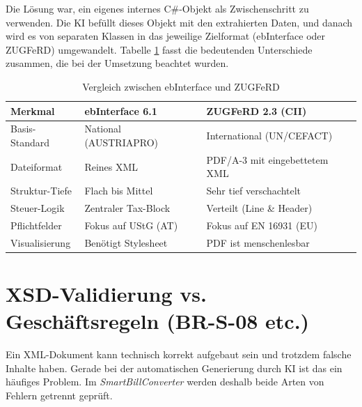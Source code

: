 Die Lösung war, ein eigenes internes C\#-Objekt als Zwischenschritt zu verwenden. Die KI befüllt dieses Objekt mit den extrahierten Daten, und danach wird es von separaten Klassen in das jeweilige Zielformat (ebInterface oder ZUGFeRD) umgewandelt.
Tabelle \ref{tab:format_comparison} fasst die bedeutenden Unterschiede zusammen, die bei der Umsetzung beachtet wurden.

\begin{table}[h]
    \centering
    \begin{tabular}{|p{4cm}|p{5cm}|p{5cm}|}
    \hline
    \textbf{Merkmal} & \textbf{ebInterface 6.1} & \textbf{ZUGFeRD 2.3 (CII)} \\
    \hline
    Basis-Standard & National (AUSTRIAPRO) & International (UN/CEFACT) \\
    \hline
    Dateiformat & Reines XML & PDF/A-3 mit eingebettetem XML \\
    \hline
    Struktur-Tiefe & Flach bis Mittel & Sehr tief verschachtelt \\
    \hline
    Steuer-Logik & Zentraler Tax-Block & Verteilt (Line \& Header) \\
    \hline
    Pflichtfelder & Fokus auf UStG (AT) & Fokus auf EN 16931 (EU) \\
    \hline
    Visualisierung & Benötigt Stylesheet & PDF ist menschenlesbar \\
    \hline
    \end{tabular}
    \caption{Vergleich zwischen ebInterface und ZUGFeRD}
    \label{tab:format_comparison}
\end{table}
\section{XSD-Validierung vs. Geschäftsregeln (BR-S-08 etc.)}
\label{sec:validation}

Ein XML-Dokument kann technisch korrekt aufgebaut sein und trotzdem falsche Inhalte haben. Gerade bei der automatischen Generierung durch KI ist das ein häufiges Problem. Im \textit{SmartBillConverter} werden deshalb beide Arten von Fehlern getrennt geprüft.

